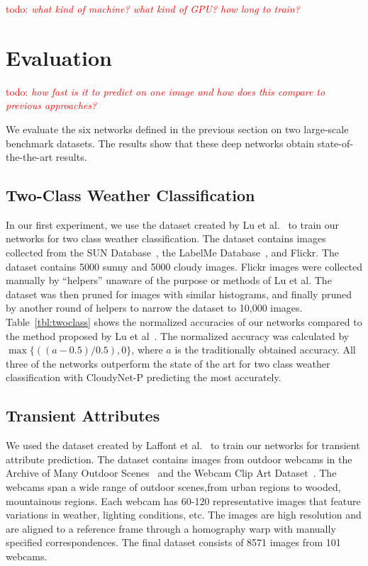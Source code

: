 \documentclass{article}
\newcommand{\todo}[1]{\textcolor{red}{todo: {\em #1}}}
\newcommand{\tblref}[1]{Table~\ref{tbl:#1}}
\begin{document}
\todo{what kind of machine? what kind of GPU? how long to train?}

\section{Evaluation}

\todo{how fast is it to predict on one image and how does this compare
to previous approaches?}

We evaluate the six networks defined in the previous section on two
large-scale benchmark datasets. The results show that these deep
networks obtain state-of-the-the-art results. 

\subsection{Two-Class Weather Classification}

In our first experiment, we use the dataset created by Lu et al.~\cite{lutwoclass} to train
our networks for two class weather classification.  The dataset
contains images collected from the SUN Database~\cite{xiaoSUN}, the
LabelMe Database~\cite{russell2008labelme}, and Flickr. The dataset
contains 5000 sunny and 5000 cloudy images. Flickr images were
collected manually by ``helpers'' unaware of the purpose or methods of
Lu et al. The dataset was then pruned for images with similar
histograms, and finally pruned by another round of helpers to narrow
the dataset to 10,000 images.  \tblref{twoclass} shows the normalized
accuracies of our networks compared to the method proposed by
Lu et al~\cite{lutwoclass}.  The normalized accuracy was calculated by
$ \max\{((a - 0.5) / 0.5), 0\} $, where $a$ is the traditionally
obtained accuracy. All three of the networks outperform the state of
the art for two class weather classification with CloudyNet-P
predicting the most accurately.

\subsection{Transient Attributes}

We used the dataset created by Laffont et al.~\cite{Laffont14} to
train our networks for transient attribute prediction. The dataset
contains images from outdoor webcams in the Archive of Many Outdoor
Scenes~\cite{jacobs07amos} and the Webcam Clip Art
Dataset~\cite{lalondesig09}.  The webcams span a wide range of outdoor
scenes,from urban regions to wooded, mountainous regions. Each webcam
has 60-120 representative images that feature variations in weather,
lighting conditions, etc.  The images are high resolution and are
aligned to a reference frame through a homography warp with manually
specified correspondences.  The final dataset consists of 8571 images
from 101 webcams.
\end{document}
